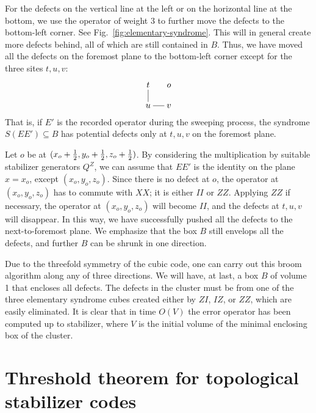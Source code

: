 For the defects on the vertical line at the left or on the horizontal line at the bottom,
we use the operator of weight 3 to further move the defects to the bottom-left corner.
See Fig.~\ref{fig:elementary-syndrome}.
This will in general create more defects behind, all of which are still contained in $B$.
Thus, we have moved all the defects on the foremost plane to the bottom-left corner
except for the three sites $t,u,v$:
\begin{equation}
\xymatrix@!0{ t \ar@{-}[d] & o \\ u \ar@{-}[r] & v }
\label{eq-diagram:last-three-defects}
\end{equation}
That is, if $E'$ is the recorded operator during the sweeping process,
the syndrome $S(EE') \subseteq B$ has potential defects only at $t,u,v$ on the foremost plane.

Let $o$ be at $(x_o+\frac{1}{2},y_o+\frac{1}{2},z_o+\frac{1}{2})$.
By considering the multiplication by suitable stabilizer generators $Q^Z$,
we can assume that $EE'$ is the identity on the plane $x=x_o$, except $(x_o,y_o,z_o)$.
Since there is no defect at $o$,
the operator at $(x_o,y_o,z_o)$ has to commute with $XX$;
it is either $II$ or $ZZ$.
Applying $ZZ$ if necessary, the operator at $(x_o,y_o,z_o)$ will become $II$,
and the defects at $t,u,v$ will disappear.
In this way, we have successfully pushed all the defects to the next-to-foremost plane.
We emphasize that the box $B$ still envelops all the defects,
and further $B$ can be shrunk in one direction.

Due to the threefold symmetry of the cubic code,
one can carry out this broom algorithm along any of three directions.
We will have, at last, a box $B$ of volume 1 that encloses all defects.
The defects in the cluster must be from one of the three elementary syndrome cubes
created either by $ZI$, $IZ$, or $ZZ$, which are easily eliminated.
It is clear that in time $O(V)$ the error operator has been computed up to stabilizer,
where $V$ is the initial volume of the minimal enclosing box of the cluster.

 

\section{Threshold theorem for topological stabilizer codes}
\label{sec:threshold}

